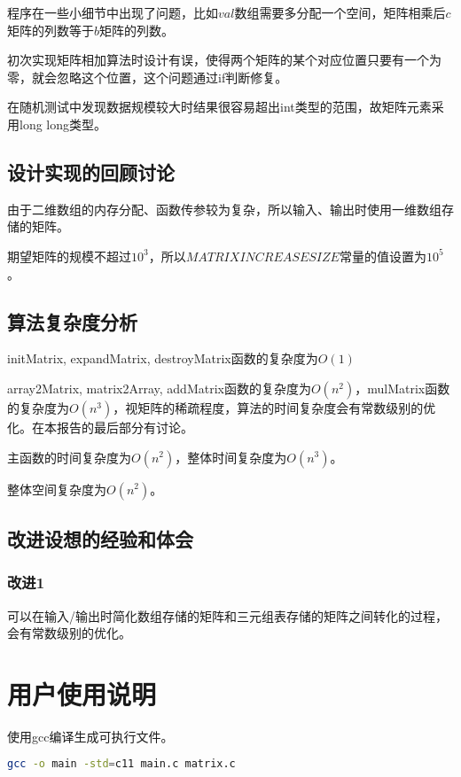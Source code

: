 \documentclass{article}
\begin{document}
程序在一些小细节中出现了问题，比如$val$数组需要多分配一个空间，矩阵相乘后$c$矩阵的列数等于$b$矩阵的列数。

初次实现矩阵相加算法时设计有误，使得两个矩阵的某个对应位置只要有一个为零，就会忽略这个位置，这个问题通过if判断修复。

在随机测试中发现数据规模较大时结果很容易超出int类型的范围，故矩阵元素采用long long类型。

\subsection{设计实现的回顾讨论}

由于二维数组的内存分配、函数传参较为复杂，所以输入、输出时使用一维数组存储的矩阵。

期望矩阵的规模不超过$10^3$，所以$MATRIXINCREASESIZE$常量的值设置为$10^5$。

\subsection{算法复杂度分析}

initMatrix, expandMatrix, destroyMatrix函数的复杂度为$O(1)$

array2Matrix, matrix2Array, addMatrix函数的复杂度为$O(n^2)$，mulMatrix函数的复杂度为$O(n^3)$，视矩阵的稀疏程度，算法的时间复杂度会有常数级别的优化。在本报告的最后部分有讨论。

主函数的时间复杂度为$O(n^2)$，整体时间复杂度为$O(n^3)$。

整体空间复杂度为$O(n^2)$。

\subsection{改进设想的经验和体会}

\subsubsection{改进1}

可以在输入/输出时简化数组存储的矩阵和三元组表存储的矩阵之间转化的过程，会有常数级别的优化。

\section{用户使用说明}

使用gcc编译生成可执行文件。

\begin{lstlisting}[language={bash},
    basicstyle=\small\consolas]
gcc -o main -std=c11 main.c matrix.c
\end{lstlisting}
\end{document}
